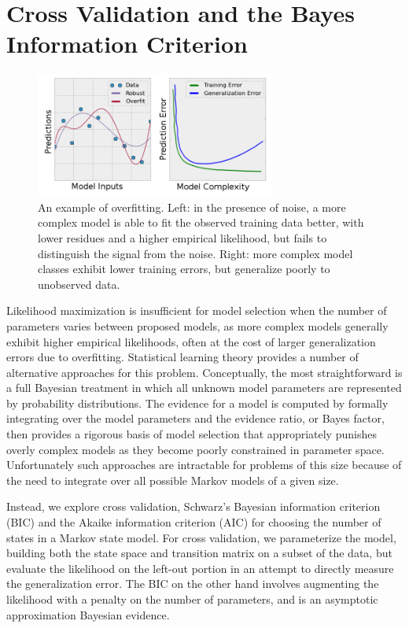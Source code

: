 \documentclass[twocolumn,floatfix,nofootinbib,aps]{revtex4-1}
\begin{document}
\section{Cross Validation and the Bayes Information Criterion}

\begin{figure}
\centering
\includegraphics[width=3.1in]{figs/overfitting.png}
\caption{An example of overfitting. Left: in the presence of noise, a more complex model is able to fit the observed training data better, with lower residues and a higher empirical likelihood, but fails to distinguish the signal from the noise. Right: more complex model classes exhibit lower training errors, but generalize poorly to unobserved data.}
\end{figure}

Likelihood maximization is insufficient for model selection when the number of parameters varies between proposed models, as more complex models generally exhibit higher empirical likelihoods, often at the cost of larger generalization errors due to overfitting\cite{Liddle2007Information, Hastie01Elements}. Statistical learning theory provides a number of alternative approaches for this problem. Conceptually, the most straightforward is a full Bayesian treatment in which all unknown model parameters are represented by probability distributions. The evidence for a model is computed by formally integrating over the model parameters and the evidence ratio, or Bayes factor\cite{Gelfand94Bayesian}, then provides a rigorous basis of model selection that appropriately punishes overly complex models as they become poorly constrained in parameter space. Unfortunately such approaches are intractable for problems of this size because of the need to integrate over all possible Markov models of a given size.

Instead, we explore cross validation, Schwarz's Bayesian information criterion (BIC)\cite{Schwartz78Estimating} and the Akaike information criterion (AIC)\cite{Akaike1974AIC} for choosing the number of states in a Markov state model. For cross validation, we parameterize the model, building both the state space and transition matrix on a subset of the data, but evaluate the likelihood on the left-out portion in an attempt to directly measure the generalization error. The BIC on the other hand involves augmenting the likelihood with a penalty on the number of parameters, and is
an asymptotic approximation Bayesian evidence.
\end{document}

